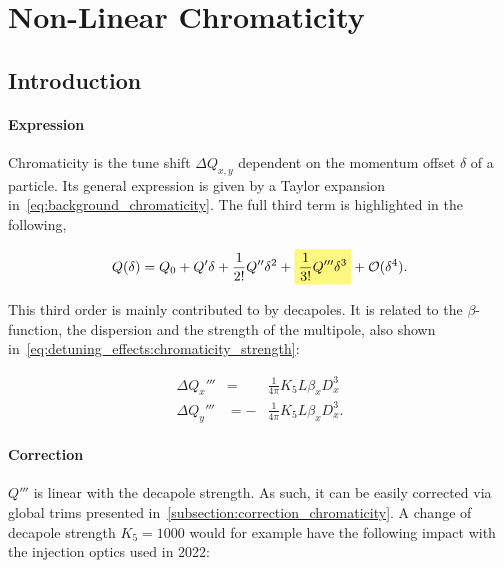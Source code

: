 \section{Non-Linear Chromaticity}



\subsection{Introduction}

\paragraph{Expression}

Chromaticity is the tune shift $\Delta Q_{x,y}$ dependent on the momentum offset $\delta$ of a
particle. Its general expression is given by a Taylor expansion
in~\cref{eq:background_chromaticity}. The full third term is highlighted in the following,

\begin{equation} 
    Q (\delta) = Q_0 + Q' \delta + \frac{1}{2!} Q'' \delta^2 
                     + \colorbox{yellow!50}{$\displaystyle  \frac{1}{3!}  Q''' \delta^3$}
                     + \mathcal{O}(\delta^4).
\end{equation}

This third order is mainly contributed to by decapoles. It is related to the $\beta$-function, the
dispersion and the strength of the multipole, also shown
in~\cref{eq:detuning_effects:chromaticity_strength}:

\begin{equation}
    \begin{aligned}
        \Delta Q_x''' &=  &\frac{1}{4\pi} K_{5} L \beta_x D_x^{3}\\
        \Delta Q_y''' &= -&\frac{1}{4\pi} K_{5} L \beta_x D_x^{3}.
    \end{aligned}
\end{equation}


\paragraph{Correction}

$Q'''$ is linear with the decapole strength. As such, it can be easily corrected via global trims
presented in~\cref{subsection:correction_chromaticity}.
A change of decapole strength $K_5 = 1000$ would for example have the following impact with the
injection optics used in 2022:


